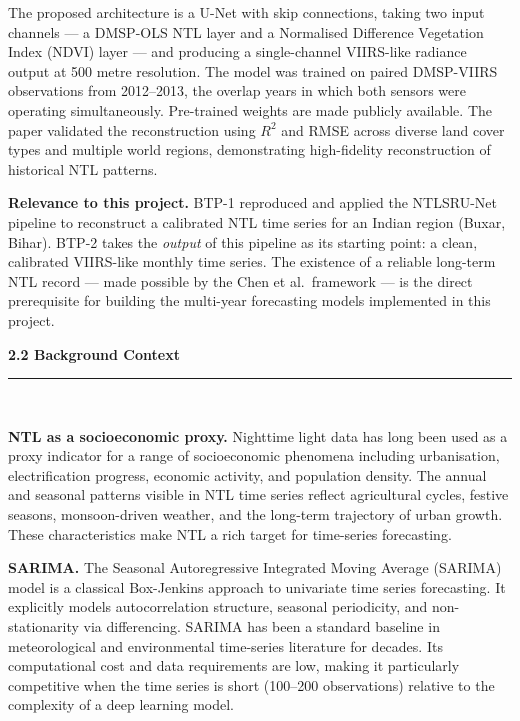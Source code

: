 \documentclass[12pt,a4paper]{report}
\begin{document}
The proposed architecture is a U-Net with skip connections, taking two input channels --- a DMSP-OLS NTL layer and a Normalised Difference Vegetation Index (NDVI) layer --- and producing a single-channel VIIRS-like radiance output at 500 metre resolution. The model was trained on paired DMSP-VIIRS observations from 2012--2013, the overlap years in which both sensors were operating simultaneously. Pre-trained weights are made publicly available. The paper validated the reconstruction using $R^2$ and RMSE across diverse land cover types and multiple world regions, demonstrating high-fidelity reconstruction of historical NTL patterns.

\textbf{Relevance to this project.} BTP-1 reproduced and applied the NTLSRU-Net pipeline to reconstruct a calibrated NTL time series for an Indian region (Buxar, Bihar). BTP-2 takes the \emph{output} of this pipeline as its starting point: a clean, calibrated VIIRS-like monthly time series. The existence of a reliable long-term NTL record --- made possible by the Chen et al.\ framework --- is the direct prerequisite for building the multi-year forecasting models implemented in this project.

\vspace{0.5cm}
\begin{center}
    \hypertarget{sec:s22}{}%
    {\large \textbf{2.2 Background Context}}\\[0.3cm]
    \noindent\rule{\linewidth}{0.4pt}\\[0.5cm]
\end{center}

\textbf{NTL as a socioeconomic proxy.} Nighttime light data has long been used as a proxy indicator for a range of socioeconomic phenomena including urbanisation, electrification progress, economic activity, and population density. The annual and seasonal patterns visible in NTL time series reflect agricultural cycles, festive seasons, monsoon-driven weather, and the long-term trajectory of urban growth. These characteristics make NTL a rich target for time-series forecasting.

\textbf{SARIMA.} The Seasonal Autoregressive Integrated Moving Average (SARIMA) model is a classical Box-Jenkins approach to univariate time series forecasting. It explicitly models autocorrelation structure, seasonal periodicity, and non-stationarity via differencing. SARIMA has been a standard baseline in meteorological and environmental time-series literature for decades. Its computational cost and data requirements are low, making it particularly competitive when the time series is short (100--200 observations) relative to the complexity of a deep learning model.
\end{document}

